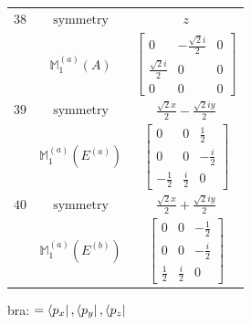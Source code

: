 \documentclass[fleqn,8pt,landscape]{jsarticle}
\begin{document}
\begin{longtable}{ccc}
$ 38 $ & $ \text{symmetry} $ & $ z $ \\
$  $ & $ \mathbb{M}_{1}^{(a)}(A) $ & $ \begin{bmatrix} 0 & - \frac{\sqrt{2} i}{2} & 0 \\ \frac{\sqrt{2} i}{2} & 0 & 0 \\ 0 & 0 & 0 \end{bmatrix} $ \\ \hline
$ 39 $ & $ \text{symmetry} $ & $ \frac{\sqrt{2} x}{2} - \frac{\sqrt{2} i y}{2} $ \\
$  $ & $ \mathbb{M}_{1}^{(a)}(E^{(a)}) $ & $ \begin{bmatrix} 0 & 0 & \frac{1}{2} \\ 0 & 0 & - \frac{i}{2} \\ - \frac{1}{2} & \frac{i}{2} & 0 \end{bmatrix} $ \\ \hline
$ 40 $ & $ \text{symmetry} $ & $ \frac{\sqrt{2} x}{2} + \frac{\sqrt{2} i y}{2} $ \\
$  $ & $ \mathbb{M}_{1}^{(a)}(E^{(b)}) $ & $ \begin{bmatrix} 0 & 0 & - \frac{1}{2} \\ 0 & 0 & - \frac{i}{2} \\ \frac{1}{2} & \frac{i}{2} & 0 \end{bmatrix} $ \\ \hline
\end{longtable}
bra: $=\bra{p_{x}}, \bra{p_{y}}, \bra{p_{z}}$
\end{document}
